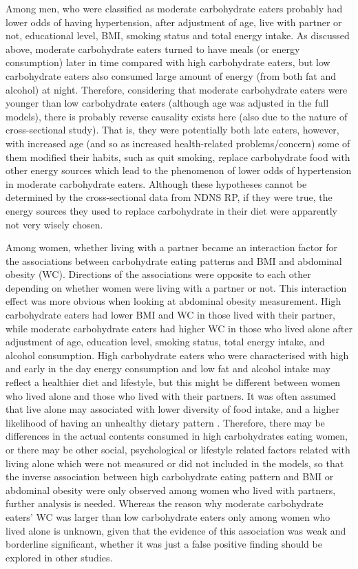 Among men, who were classified as moderate carbohydrate eaters probably had lower odds of having hypertension, after adjustment of age, live with partner or not, educational level, BMI, smoking status and total energy intake. As discussed above, moderate carbohydrate eaters turned to have meals (or energy consumption) later in time compared with high carbohydrate eaters, but low carbohydrate eaters also consumed large amount of energy (from both fat and alcohol) at night. Therefore, considering that moderate carbohydrate eaters were younger than low carbohydrate eaters (although age was adjusted in the full models), there is probably reverse causality exists here (also due to the nature of cross-sectional study). That is, they were potentially both late eaters, however, with increased age (and so as increased health-related problems/concern) some of them modified their habits, such as quit smoking, replace carbohydrate food with other energy sources which lead to the phenomenon of lower odds of hypertension in moderate carbohydrate eaters. Although these hypotheses cannot be determined by the cross-sectional data from NDNS RP, if they were true, the energy sources they used to replace carbohydrate in their diet were apparently not very wisely chosen. 

Among women, whether living with a partner became an interaction factor for the associations between carbohydrate eating patterns and BMI and abdominal obesity (WC). Directions of the associations were opposite to each other depending on whether women were living with a partner or not. This interaction effect was more obvious when looking at abdominal obesity measurement. High carbohydrate eaters had lower BMI and WC in those lived with their partner, while moderate carbohydrate eaters had higher WC in those who lived alone after adjustment of age, education level, smoking status, total energy intake, and alcohol consumption. High carbohydrate eaters who were characterised with high and early in the day energy consumption and low fat and alcohol intake may reflect a healthier diet and lifestyle, but this might be different between women who lived alone and those who lived with their partners. It was often assumed that live alone may associated with lower diversity of food intake, and a higher likelihood of having an unhealthy dietary pattern \parencite{hanna2015relationship}. Therefore, there may be differences in the actual contents consumed in high carbohydrates eating women, or there may be other social, psychological or lifestyle related factors related with living alone which were not measured or did not included in the models, so that the inverse association between high carbohydrate eating pattern and BMI or abdominal obesity were only observed among women who lived with partners, further analysis is needed. Whereas the reason why moderate carbohydrate eaters' WC was larger than low carbohydrate eaters only among women who lived alone is unknown, given that the evidence of this association was weak and borderline significant, whether it was just a false positive finding should be explored in other studies.

